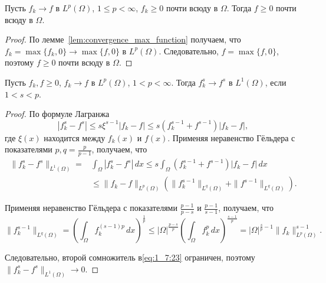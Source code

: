 \begin{lemma}
    \label{lem:convergence_positive_functions}
    Пусть $f_k \to f$ в $L^p(\Omega)$, $1 \leq p < \infty$,
    $f_k \geq 0$ почти всюду в $\Omega$.
    Тогда $f \geq 0$ почти всюду в $\Omega$.
\end{lemma}

\begin{proof}
    По лемме~\ref{lem:convergence_max_function} получаем,
    что $f_k = \max\{f_k, 0\} \to \max\{f, 0\}$ в $L^p(\Omega)$.
    Следовательно, $f = \max\{f, 0\}$,
    поэтому $f \geq 0$ почти всюду в $\Omega$.
\end{proof}

\begin{lemma}
    \label{lem:convergence_power_functions}
    Пусть $f_k, f \geq 0$, $f_k \to f$ в $L^p(\Omega)$, $1 < p < \infty$.
    Тогда $f_k^s \to f^s$ в $L^1(\Omega)$, если $1 < s < p$.
\end{lemma}

\begin{proof}
    По формуле Лагранжа
    \[
        |f_k^s - f^s| \leq s \xi^{s-1} |f_k - f|
        \leq s(f_k^{s-1} + f^{s-1}) |f_k - f|,
    \]
    где $\xi(x)$ находится между $f_k(x)$ и $f(x)$.
    Применяя неравенство Гёльдера с показателями
    $p, q = \frac{p}{p-1}$, получаем, что
    \begin{equation}
        \label{eq:1_7:23}
        \begin{split}
            \|f_k^s - f^s\|_{L^1(\Omega)} =
            &\int_{\Omega} |f_k^s - f^s| \, dx
            \leq s \int_{\Omega} (f_k^{s-1} + f^{s-1}) |f_k - f| \, dx \\
            &\leq \|f_k - f\|_{L^p(\Omega)} \left( \|f_k^{s-1}\|_{L^q(\Omega)}
            + \|f^{s-1}\|_{L^q(\Omega)} \right).
        \end{split}
    \end{equation}

    Применяя неравенство Гёльдера с показателями $\frac{p-1}{p-s}$
    и $\frac{p-1}{s-1}$, получаем, что
    \[
        \|f_k^{s-1}\|_{L^q(\Omega)} = \left(\int_{\Omega} f_k^{(s-1)p}\,
        dx\right)^{\frac{1}{p}} \leq |\Omega|^{\frac{p-s}{p}}
        \left(\int_{\Omega} f_k^p\, dx\right)^{\frac{s-1}{p}} =
        |\Omega|^{\frac{s}{p}-1} \|f_k\|_{L^p(\Omega)}^{s-1}.
    \]

    Следовательно, второй сомножитель в\eqref{eq:1_7:23} ограничен,
    поэтому $\|f_k^s - f^s\|_{L^1(\Omega)} \to 0$.
\end{proof}

